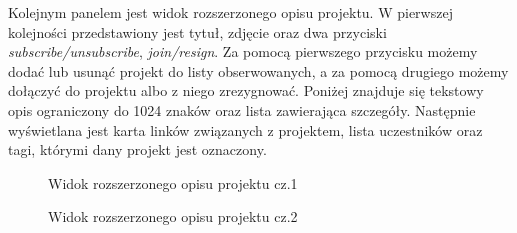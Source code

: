 Kolejnym panelem jest widok rozszerzonego opisu projektu. W pierwszej kolejności przedstawiony jest tytuł, zdjęcie oraz dwa przyciski \textit{subscribe/unsubscribe}, \textit{join/resign}. Za pomocą pierwszego przycisku możemy dodać lub usunąć projekt do listy obserwowanych, a za pomocą drugiego możemy dołączyć do projektu albo z niego zrezygnować. Poniżej znajduje się tekstowy opis ograniczony do 1024 znaków oraz lista zawierająca szczegóły. Następnie wyświetlana jest karta linków związanych z projektem, lista uczestników oraz tagi, którymi dany projekt jest oznaczony.

\begin{figure}[h!]
	\caption{Widok rozszerzonego opisu projektu cz.1}
	\centering
\end{figure}

\begin{figure}[h!]
	\caption{Widok rozszerzonego opisu projektu cz.2}
	\centering
\end{figure}

